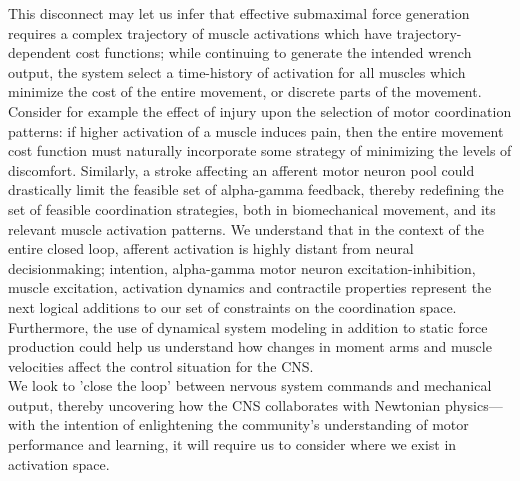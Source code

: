 This disconnect may let us infer that effective submaximal force generation requires a complex trajectory of muscle activations which have trajectory-dependent cost functions; while continuing to generate the intended wrench output, the system select a time-history of activation for all muscles which minimize the cost of the entire movement, or discrete parts of the movement.
Consider for example the effect of injury upon the selection of motor coordination patterns: if higher activation of a muscle induces pain, then the entire movement cost function must naturally incorporate some strategy of minimizing the levels of discomfort. Similarly, a stroke affecting an afferent motor neuron pool could drastically limit the feasible set of alpha-gamma feedback, thereby redefining the set of feasible coordination strategies, both in biomechanical movement, and its relevant muscle activation patterns.
We understand that in the context of the entire closed loop, afferent activation is highly distant from neural decisionmaking;  intention, alpha-gamma motor neuron excitation-inhibition, muscle excitation, activation dynamics and contractile properties represent the next logical additions to our set of constraints on the coordination space. Furthermore, the use of dynamical system modeling in addition to static force production could help us understand how changes in moment arms and muscle velocities affect the control situation for the CNS.\\

We look to 'close the loop' between nervous system commands and mechanical output, thereby uncovering how the CNS collaborates with Newtonian physics--- with the intention of enlightening the community's understanding of motor performance and learning, it will require us to consider where we exist in activation space.
